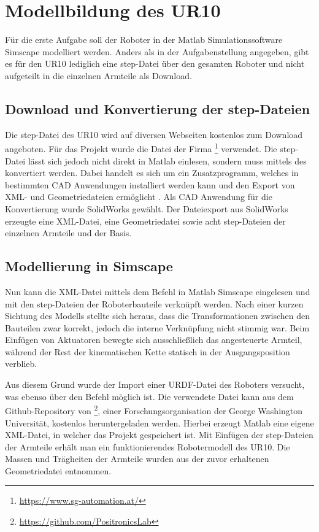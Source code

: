 \section{Modellbildung des UR10}

Für die erste Aufgabe soll der Roboter in der Matlab Simulationssoftware Simscape modelliert werden.
Anders als in der Aufgabenstellung angegeben, gibt es für den UR10 lediglich eine step-Datei über den gesamten Roboter und nicht aufgeteilt in die einzelnen Armteile als Download.


\subsection{Download und Konvertierung der step-Dateien}
Die step-Datei des UR10 wird auf diversen Webseiten kostenlos zum Download angeboten.
Für das Projekt wurde die Datei der Firma \footnote{\url{https://www.sg-automation.at/}} verwendet.
Die step-Datei lässt sich jedoch nicht direkt in Matlab einlesen, sondern muss mittels des  konvertiert werden.
Dabei handelt es sich um ein Zusatzprogramm, welches in bestimmten CAD Anwendungen installiert werden kann und den Export von XML- und Geometriedateien ermöglicht \cite{sm_plugin}.
Als CAD Anwendung für die Konvertierung wurde SolidWorks gewählt. 
Der Dateiexport aus SolidWorks erzeugte eine XML-Datei, eine Geometriedatei  sowie acht step-Dateien der einzelnen Armteile und der Basis.


\subsection{Modellierung in Simscape}

Nun kann die XML-Datei mittels dem Befehl  in Matlab Simscape eingelesen und mit den step-Dateien der Roboterbauteile verknüpft werden.
Nach einer kurzen Sichtung des Modells stellte sich heraus, dass die Transformationen zwischen den Bauteilen zwar korrekt, jedoch die interne Verknüpfung nicht stimmig war.
Beim Einfügen von Aktuatoren bewegte sich ausschließlich das angesteuerte Armteil, während der Rest der kinematischen Kette statisch in der Ausgangsposition verblieb. 

Aus diesem Grund wurde der Import einer URDF-Datei des Roboters versucht, was ebenso über den Befehl  möglich ist.
Die verwendete Datei kann aus dem Github-Repository von \footnote{\url{https://github.com/PositronicsLab}}, einer Forschungsorganisation der George Washington Universität, kostenlos heruntergeladen werden.
Hierbei erzeugt Matlab eine eigene XML-Datei, in welcher das Projekt gespeichert ist.
Mit Einfügen der step-Dateien der Armteile erhält man ein funktionierendes Robotermodell des UR10.
Die Massen und Trägheiten der Armteile wurden aus der zuvor erhaltenen Geometriedatei entnommen.



